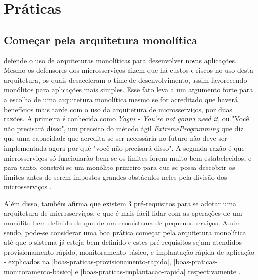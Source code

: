 \chapter{Práticas}\label{chapter-boas-praticas}


\section{Começar pela arquitetura monolítica}


 defende o uso de arquiteturas monolíticas para desenvolver novas aplicações. Mesmo os defensores dos microsserviços dizem que há custos e riscos no uso desta arquitetura, os quais desaceleram o time de desenvolvimento, assim favorecendo monólitos para aplicações mais simples. Esse fato leva a um argumento forte para a escolha de uma arquitetura monolítica mesmo se for acreditado que haverá benefícios mais tarde com o uso da arquitetura de microsserviços, por duas razões. A primeira é conhecida como \emph{Yagni - You're not gonna need it}, ou "Você não precisará disso", um preceito do método ágil \emph{ExtremeProgramming} que diz que uma capacidade que acredita-se ser necessária no futuro não deve ser implementada agora por quê "você não precisará disso". A segunda razão é que microsserviços só funcionarão bem se os limites forem muito bem estabelecidos, e para tanto, constrói-se um monólito primeiro para que se possa descobrir os limites antes de serem impostos grandes obstáculos neles pela divisão dos microsserviços \cite{martin-fowler-monolith-first}.

Além disso,  também afirma que existem 3 pré-requisitos para se adotar uma arquitetura de microsserviços, e que é mais fácil lidar com as operações de um monólito bem definido do que de um ecossistema de pequenos serviços. Assim sendo, pode-se considerar uma boa prática começar pela arquitetura monolítica até que o sistema já esteja bem definido e estes pré-requisitos sejam atendidos - provisionamento rápido, monitoramento básico, e implantação rápida de aplicação - explicados na \autoref{boas-praticas-provisionamento-rapido}, \autoref{boas-praticas-monitoramento-basico} e \autoref{boas-praticas-implantacao-rapida} respectivamente \cite{martin-fowler-microservice-prereq}.

